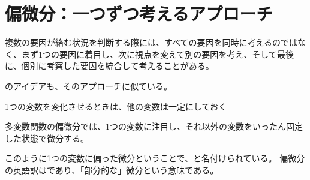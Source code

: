 \documentclass[../../../topic_calculus]{subfiles}
\begin{document}
\sectionline
\section{偏微分：一つずつ考えるアプローチ}

複数の要因が絡む状況を判断する際には、すべての要因を同時に考えるのではなく、まず1つの要因に着目し、次に視点を変えて別の要因を考え、そして最後に、個別に考察した要因を統合して考えることがある。

\br

のアイデアも、そのアプローチに似ている。

\begin{emphabox}
  \begin{spacebox}
    \begin{center}
    1つの変数を変化させるときは、他の変数は一定にしておく
  \end{center}
  \end{spacebox}
\end{emphabox}

多変数関数の偏微分では、1つの変数に注目し、それ以外の変数をいったん固定した状態で微分する。

\br

このように1つの変数に偏った微分ということで、と名付けられている。
偏微分の英語訳はであり、「部分的な」微分という意味である。
\end{document}
